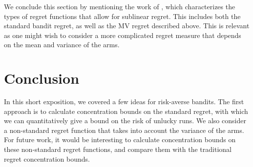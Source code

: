 \documentclass[11pt]{article}
\begin{document}
We conclude this section by mentioning the work of \cite{zimin2014generalized}, which characterizes the types of regret functions that allow for sublinear regret. This includes both the standard bandit regret, as well as the MV regret described above. This is relevant as one might wish to consider a more complicated regret measure that depends on the mean and variance of the arms.

\section{Conclusion}

In this short exposition, we covered a few ideas for risk-averse bandits. The first approach is to calculate concentration bounds on the standard regret, with which we can quantitatively give a bound on the risk of unlucky runs. We also consider a non-standard regret function that takes into account the variance of the arms. For future work, it would be interesting to calculate concentration bounds on these non-standard regret functions, and compare them with the traditional regret concentration bounds.


\end{document}
